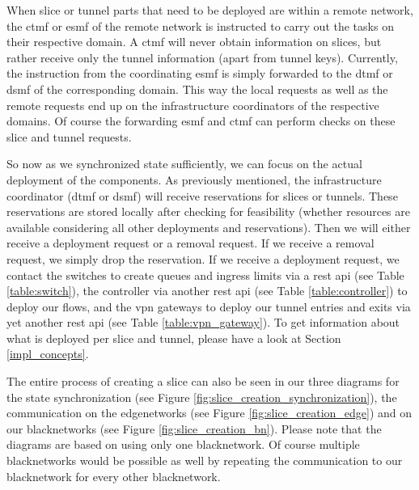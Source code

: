 When slice or tunnel parts that need to be deployed are within a remote network, the \acrshort{ctmf} or \acrshort{esmf} of the remote network is instructed to carry out the tasks on their respective domain. A \acrshort{ctmf} will never obtain information on slices, but rather receive only the tunnel information (apart from tunnel keys). Currently, the instruction from the coordinating \acrshort{esmf} is simply forwarded to the \acrshort{dtmf} or \acrshort{dsmf} of the corresponding domain. This way the local requests as well as the remote requests end up on the infrastructure coordinators of the respective domains. Of course the forwarding \acrshort{esmf} and \acrshort{ctmf} can perform checks on these slice and tunnel requests.

So now as we synchronized state sufficiently, we can focus on the actual deployment of the components. As previously mentioned, the infrastructure coordinator (\acrshort{dtmf} or \acrshort{dsmf}) will receive reservations for slices or tunnels. These reservations are stored locally after checking for feasibility (whether resources are available considering all other deployments and reservations). Then we will either receive a deployment request or a removal request. If we receive a removal request, we simply drop the reservation. If we receive a deployment request, we contact the switches to create queues and ingress limits via a \acrshort{rest} \acrshort{api} (see Table \ref{table:switch}), the controller via another \acrshort{rest} \acrshort{api} (see Table \ref{table:controller}) to deploy our flows, and the \acrshort{vpn} gateways to deploy our tunnel entries and exits via yet another \acrshort{rest} \acrshort{api} (see Table \ref{table:vpn_gateway}). To get information about what is deployed per slice and tunnel, please have a look at Section \ref{impl_concepts}.

The entire process of creating a slice can also be seen in our three diagrams for the state synchronization (see Figure \ref{fig:slice_creation_synchronization}), the communication on the \gls{edgenetwork}s (see Figure \ref{fig:slice_creation_edge}) and on our \gls{blacknetwork}s (see Figure \ref{fig:slice_creation_bn}). Please note that the diagrams are based on using only one \gls{blacknetwork}. Of course multiple \gls{blacknetwork}s would be possible as well by repeating the communication to our \gls{blacknetwork} for every other \gls{blacknetwork}.

\newpage

